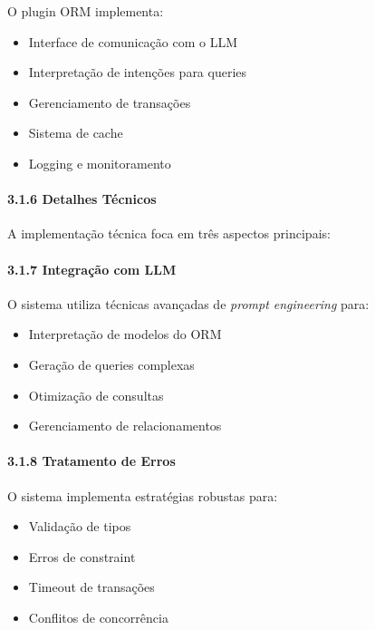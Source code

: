 \documentclass[
]{article}
\providecommand{\tightlist}{%
  \setlength{\itemsep}{0pt}\setlength{\parskip}{0pt}}
\begin{document}
O plugin ORM implementa:

\begin{itemize}
\tightlist
\item
  Interface de comunicação com o LLM
\item
  Interpretação de intenções para queries
\item
  Gerenciamento de transações
\item
  Sistema de cache
\item
  Logging e monitoramento
\end{itemize}

\paragraph{3.1.6 Detalhes Técnicos}\label{detalhes-tuxe9cnicos}

A implementação técnica foca em três aspectos principais:

\paragraph{3.1.7 Integração com LLM}\label{integrauxe7uxe3o-com-llm}

O sistema utiliza técnicas avançadas de \emph{prompt engineering} para:

\begin{itemize}
\tightlist
\item
  Interpretação de modelos do ORM
\item
  Geração de queries complexas
\item
  Otimização de consultas
\item
  Gerenciamento de relacionamentos
\end{itemize}

\paragraph{3.1.8 Tratamento de Erros}\label{tratamento-de-erros}

O sistema implementa estratégias robustas para:

\begin{itemize}
\tightlist
\item
  Validação de tipos
\item
  Erros de constraint
\item
  Timeout de transações
\item
  Conflitos de concorrência
\end{itemize}
\end{document}

